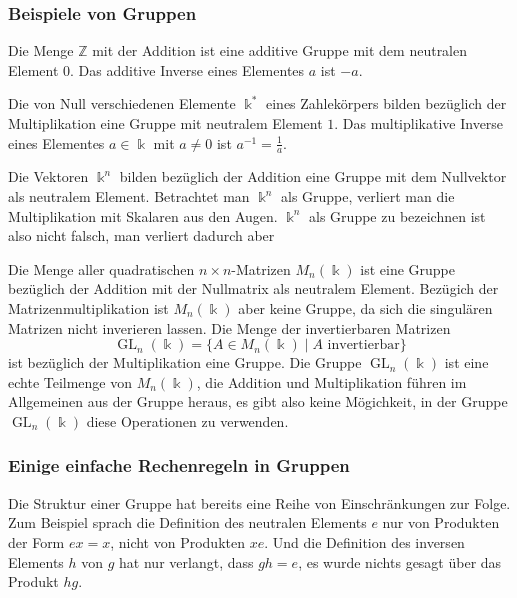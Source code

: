 \subsubsection{Beispiele von Gruppen}

\begin{beispiel}
Die Menge $\mathbb{Z}$ mit der Addition ist eine additive Gruppe mit
dem neutralen Element $0$.
Das additive Inverse eines Elementes $a$ ist $-a$.
\end{beispiel}

\begin{beispiel}
Die von Null verschiedenen Elemente $\Bbbk^*$ eines Zahlekörpers bilden
bezüglich der Multiplikation eine Gruppe mit neutralem Element $1$.
Das multiplikative Inverse eines Elementes $a\in \Bbbk$ mit $a\ne 0$
ist $a^{-1}=\frac1{a}$.
\end{beispiel}

\begin{beispiel}
Die Vektoren $\Bbbk^n$ bilden bezüglich der Addition eine Gruppe mit
dem Nullvektor als neutralem Element.
Betrachtet man $\Bbbk^n$ als Gruppe, verliert man die Multiplikation
mit Skalaren aus den Augen.
$\Bbbk^n$ als Gruppe zu bezeichnen ist also nicht falsch, man
verliert dadurch aber 
\end{beispiel}

\begin{beispiel}
Die Menge aller quadratischen $n\times n$-Matrizen $M_n(\Bbbk)$ ist
eine Gruppe bezüglich der Addition mit der Nullmatrix als neutralem
Element.
Bezügich der Matrizenmultiplikation ist $M_n(\Bbbk)$ aber keine
Gruppe, da sich die singulären Matrizen nicht inverieren lassen.
Die Menge der invertierbaren Matrizen
\[
\operatorname{GL}_n(\Bbbk)
=
\{
A\in M_n(\Bbbk)\;|\; \text{$A$ invertierbar}
\}
\]
ist bezüglich der Multiplikation eine Gruppe.
Die Gruppe $\operatorname{GL}_n(\Bbbk)$ ist eine echte Teilmenge 
von $M_n(\Bbbk)$, die Addition und Multiplikation führen im Allgemeinen
aus der Gruppe heraus, es gibt also keine Mögichkeit, in der Gruppe
$\operatorname{GL}_n(\Bbbk)$ diese Operationen zu verwenden.
\end{beispiel}

\subsubsection{Einige einfache Rechenregeln in Gruppen}
Die Struktur einer Gruppe hat bereits eine Reihe von
Einschränkungen zur Folge.
Zum Beispiel sprach die Definition des neutralen Elements $e$ nur von
Produkten der Form $ex=x$, nicht von Produkten $xe$.
Und die Definition des inversen Elements $h$ von $g$ hat nur
verlangt, dass $gh=e$, es wurde nichts gesagt über das Produkt $hg$.

